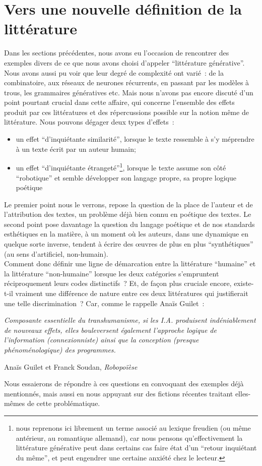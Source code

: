 \documentclass{article}
\newenvironment{citationbox}
{\begin{center}
		\begin{minipage}{.8\textwidth}
		}
		{
		\end{minipage}	
\end{center}
}
\begin{document}
	\section{Vers une nouvelle définition de la littérature}\label{nouvelle_definition}
		Dans les sections précédentes, nous avons eu l'occasion de rencontrer des exemples divers de ce que nous avons choisi d'appeler  ``littérature générative''. Nous avons aussi pu voir que leur degré de complexité ont varié~: de la combinatoire, aux réseaux de neurones récurrents, en passant par les modèles à trous, les grammaires génératives etc.
		Mais nous n'avons pas encore discuté d'un point pourtant crucial dans cette affaire, qui concerne l'ensemble des effets produit par ces littératures et des répercussions possible sur la notion même de littérature. Nous pouvons dégager deux types d'effets~:
		\begin{itemize}
			\item un effet ``d'inquiétante similarité'', lorsque le texte ressemble à s'y méprendre à un texte écrit par un auteur humain;
			\item un effet ``d'inquiétante étrangeté''\footnote{nous reprenons ici librement un terme associé au lexique freudien (ou même antérieur, au romantique allemand), car nous pensons qu'effectivement la littérature générative peut dans certains cas faire état d'un ``retour inquiétant du même'', et peut engendrer une certaine anxiété chez le lecteur.}, lorsque le texte assume son côté ``robotique'' et semble développer son langage propre, sa propre logique poétique
		\end{itemize}
		Le premier point nous le verrons, repose la question de la place de l'auteur et de l'attribution des textes, un problème déjà bien connu en poétique des textes. Le second point pose davantage la question du langage poétique et de nos standards esthétiques en la matière, à un moment où les auteurs, dans une dynamique en quelque sorte inverse, tendent à écrire des œuvres de plus en plus ``synthétiques'' (au sens d'artificiel, non-humain).\\
		Comment donc définir une ligne de démarcation entre la littérature ``humaine'' et la littérature ``non-humaine'' lorsque les deux catégories s'empruntent réciproquement leurs codes distinctifs ? Et, de façon plus cruciale encore, existe-t-il vraiment une différence de nature entre ces deux littératures qui justifierait une telle discrimination ? Car, comme le rappelle Anaïs Guilet~:
		\begin{citationbox}
			\textit{Composante essentielle du transhumanisme, si les I.A. produisent indéniablement de nouveaux effets, elles bouleversent également l'approche logique de l'information (connexionniste) ainsi que la conception (presque phénoménologique) des programmes.}
			\begin{flushright}
				Anaïs Guilet et Franck Soudan, \textit{Robopoïèse} \cite{guilet2017}
			\end{flushright}
		\end{citationbox}
		Nous essaierons de répondre à ces questions en convoquant des exemples déjà mentionnés, mais aussi en nous appuyant sur des fictions récentes traitant elles-mêmes de cette problématique.
\end{document}
